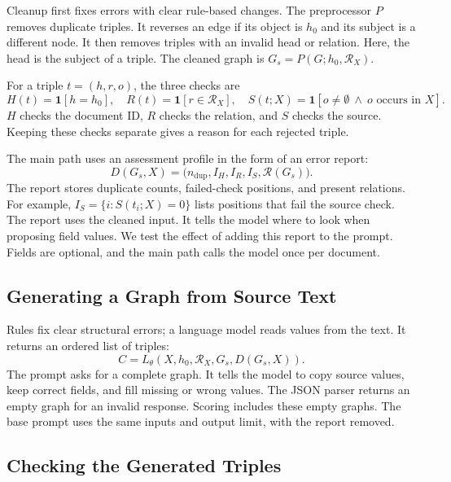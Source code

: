 Cleanup first fixes errors with clear rule-based changes.
The preprocessor $P$ removes duplicate triples.
It reverses an edge if its object is $h_0$ and its subject is a different node.
It then removes triples with an invalid head or relation.
Here, the head is the subject of a triple.
The cleaned graph is $G_s=P(G;h_0,\mathcal R_X)$.

For a triple $t=(h,r,o)$, the three checks are
\begin{equation}
    \label{eq:diagnostic_predicates}
    H(t)=\mathbf1[h=h_0],\quad
    R(t)=\mathbf1[r\in\mathcal R_X],\quad
    S(t;X)=\mathbf1[o\ne\emptyset\ \wedge\ o\text{ occurs in }X].
\end{equation}
$H$ checks the document ID, $R$ checks the relation, and $S$ checks the source.
Keeping these checks separate gives a reason for each rejected triple.

The main path uses an assessment profile in the form of an error report:
\begin{equation}
    \label{eq:diagnostic_context}
    D(G_s,X)=\big(n_{\mathrm{dup}},I_H,I_R,I_S,\mathcal R(G_s)\big).
\end{equation}
The report stores duplicate counts, failed-check positions, and present relations.
For example, $I_S=\{i:S(t_i;X)=0\}$ lists positions that fail the source check.
The report uses the cleaned input.
It tells the model where to look when proposing field values.
We test the effect of adding this report to the prompt.
Fields are optional, and the main path calls the model once per document.

\subsection{Generating a Graph from Source Text}
\label{sec:framework:architecture}

Rules fix clear structural errors; a language model reads values from the text.
It returns an ordered list of triples:
\begin{equation}
    \label{eq:proposal_generation}
    C=L_\theta(X,h_0,\mathcal R_X,G_s,D(G_s,X)).
\end{equation}
The prompt asks for a complete graph.
It tells the model to copy source values, keep correct fields, and fill missing
or wrong values.
The JSON parser returns an empty graph for an invalid response.
Scoring includes these empty graphs.
The base prompt uses the same inputs and output limit, with the report removed.

\subsection{Checking the Generated Triples}
\label{sec:framework:constraints}


